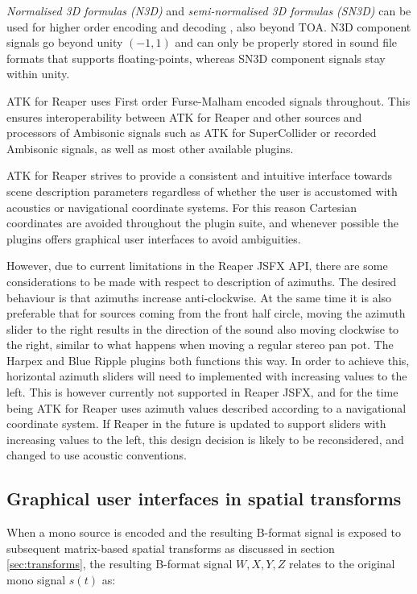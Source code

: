 \documentclass{article}
\begin{document}
\emph{Normalised 3D formulas (N3D)} and \emph{semi-normalised 3D formulas (SN3D)} can be used for higher order encoding and decoding  \cite{daniel:2001phd}, also beyond TOA.
N3D component signals go beyond unity $(-1, 1)$ and can only be properly stored in sound file formats that supports floating-points, whereas SN3D component signals stay within unity. 

ATK for Reaper uses First order Furse-Malham encoded signals throughout.
This ensures interoperability between ATK for Reaper and other sources and processors of Ambisonic signals such as ATK for SuperCollider or recorded Ambisonic signals, as well as most other available plugins.

ATK for Reaper strives to provide a consistent and intuitive interface towards scene description parameters regardless of whether the user is accustomed with acoustics or navigational coordinate systems.
For this reason Cartesian coordinates are avoided throughout the plugin suite, and whenever possible the plugins offers graphical user interfaces to avoid ambiguities.

However, due to current limitations in the Reaper JSFX API, there are some considerations to be made with respect to description of azimuths.
The desired behaviour is that azimuths increase anti-clockwise.
At the same time it is also preferable that for sources coming from the front half circle, moving the azimuth slider to the right results in the direction of the sound also moving clockwise to the right, similar to what happens when moving a regular stereo pan pot.
The Harpex and Blue Ripple plugins both functions this way.
In order to achieve this, horizontal azimuth sliders will need to implemented with increasing values to the left.
This is however currently not supported in Reaper JSFX, and for the time being ATK for Reaper uses azimuth values described according to a navigational coordinate system.
If Reaper in the future is updated to support sliders with increasing values to the left, this design decision is likely to be reconsidered, and changed to use acoustic conventions.




\subsection{Graphical user interfaces in spatial transforms}\label{sec:gui}

When a mono source is encoded and the resulting B-format signal is exposed to subsequent matrix-based spatial transforms as discussed in section \ref{sec:transforms}, the resulting B-format signal $W, X, Y, Z$ relates to the original mono signal $s(t)$ as:
\end{document}
